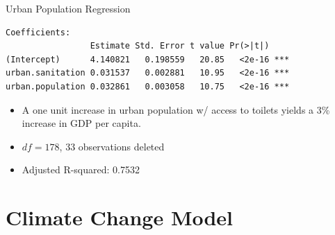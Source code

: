 \documentclass{beamer}
\begin{document}
\begin{frame}[fragile]{{\sc Urban Population} Regression}
\small
\begin{verbatim}
Coefficients:
                 Estimate Std. Error t value Pr(>|t|)    
(Intercept)      4.140821   0.198559   20.85   <2e-16 ***
urban.sanitation 0.031537   0.002881   10.95   <2e-16 ***
urban.population 0.032861   0.003058   10.75   <2e-16 ***
\end{verbatim}
\begin{itemize}
\item A one unit increase in urban population w/ access to toilets yields a 3\% increase in GDP per capita.
\item $df = 178$, 33 observations deleted 
\item Adjusted R-squared:  0.7532
\end{itemize}
\end{frame}




\section{Climate Change Model}
\end{document}
